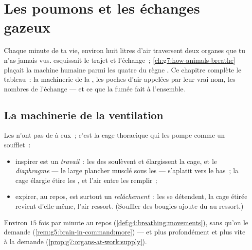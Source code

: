 \chapter{Les poumons et les échanges gazeux}\label{ch:g7:lungs-and-gas-exchange}

Chaque minute de ta vie, environ huit litres d'air traversent deux
organes que tu n'as jamais vus.  esquissait le
trajet et l'échange~; \cref{ch:g7:how-animals-breathe} plaçait la
machine humaine parmi les quatre du règne . Ce chapitre
complète le tableau~: la machinerie de la , les poches
d'air appelées par leur vrai nom, les nombres de l'échange --- et ce
que la fumée fait à l'ensemble.

\section{La machinerie de la ventilation}

\begin{proposition}\label{prop:g7:lungs-and-gas-exchange:ventilation}
Les  n'ont pas de  à eux~; c'est la cage thoracique
qui les pompe comme un soufflet~:
\begin{itemize}
  \item inspirer est un \emph{travail}~: les  des 
        soulèvent et élargissent la cage, et le
        \emph{diaphragme} --- le large plancher
        musclé sous les  --- s'aplatit vers le bas~; la cage
        élargie étire les , et l'air entre les remplir~;
  \item expirer, au repos, est surtout un \emph{relâchement}~: les
         se détendent, la cage étirée revient d'elle-même,
        l'air ressort. (Souffler des bougies ajoute du  au
        ressort.)
\end{itemize}
Environ $15$ fois par minute au repos
(\cref{def:g4:breathing:movements}), sans qu'on le demande
(\cref{rem:g5:brain-in-command:more}) --- et plus profondément et
plus vite à la demande
(\cref{prop:g7:organs-at-work:supply}).
\end{proposition}
\admitted

